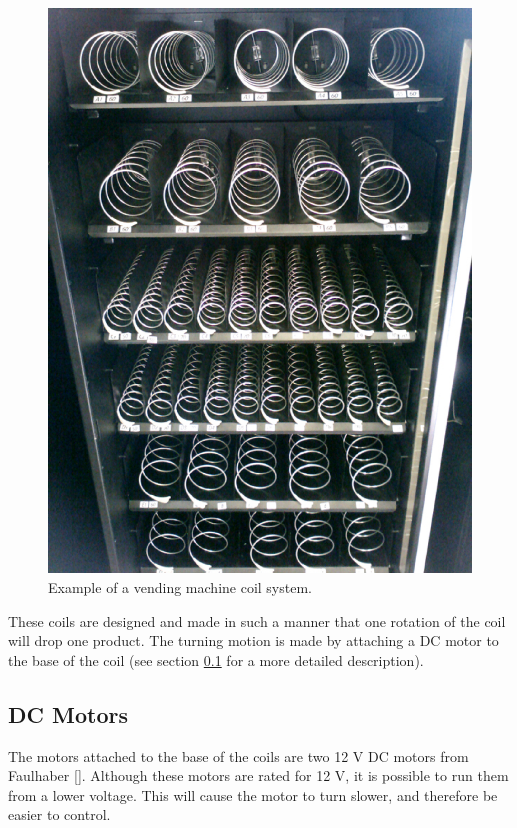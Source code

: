 \begin{figure}
\centering
\includegraphics[scale=0.2]{vm_coils.eps}
\caption{Example of a vending machine coil system.}
\label{fig:vm-coils}
\end{figure}

These coils are designed and made in such a manner that one rotation of the coil will drop one
product. The turning motion is made by attaching a DC motor to the base of the coil (see
section \ref{sec:dc-motor} for a more detailed description).

\subsection{DC Motors}
\label{sec:dc-motor}

The motors attached to the base of the coils are two 12 V DC motors from Faulhaber
[\cite{manual:dc-motors}]. Although these motors are rated for 12 V, it is possible to run them
from a lower voltage. This will cause the motor to turn slower, and therefore be easier to
control. 

